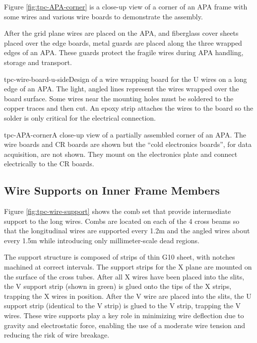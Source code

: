 Figure \ref{fig:tpc-APA-corner} is a close-up view of a corner of an APA frame with some wires and various wire boards to demonstrate the assembly.

After the grid plane wires are placed on the APA, and fiberglass cover sheets placed over the edge boards, metal guards are placed along the three wrapped edges of an APA. These guards protect the fragile wires during APA handling, storage and transport.



\begin{cdrfigure}{tpc-wire-board-u-side}{Design of a wire wrapping board for the U wires on a long edge of an APA. The light, angled lines represent the wires wrapped over the board surface. Some wires near the mounting holes must be soldered to the copper traces and then cut.  An epoxy strip attaches the wires to the board so the solder is only critical for the electrical connection.}
\end{cdrfigure}


\begin{cdrfigure}{tpc-APA-corner}{A close-up view of a partially assembled corner of an APA.  The wire boards and CR boards are shown but the ``cold electronics boards'', for data acquisition, are not shown.  They mount on the electronics plate and connect electrically to the CR boards.}
\end{cdrfigure}


\subsection{Wire Supports on Inner Frame Members}
\label{subsec:fd-ref-wiresupp}

Figure \ref{fig:tpc-wire-support} shows the comb set that provide intermediate support to the long wires.  Combs are located on each of the 4 cross beams so that the longitudinal wires are supported every 1.2m and the angled wires about every 1.5m while introducing only millimeter-scale dead regions.

The support structure is composed of strips of thin G10 sheet, with notches machined at correct intervals. The support strips for the X plane are mounted on the surface of the cross tubes.  After all X wires have been placed into the slits, the V support strip (shown in green) is glued onto the tips of the X strips, trapping the X wires in position.  After the V wire are placed into the slits, the U support strip (identical to the V strip) is glued to the V strip, trapping the V wires.  These wire supports play a key role in minimizing wire deflection due to gravity and electrostatic force, enabling the use of a moderate wire tension and reducing the risk of wire breakage.



